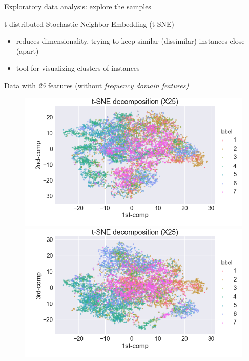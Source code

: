 \documentclass{if-beamer}
\begin{document}
\begin{frame}{Exploratory data analysis: explore the samples}

        \begin{block}{t-distributed Stochastic Neighbor Embedding (t-SNE)}    
        \begin{itemize}
                \item reduces dimensionality, trying to keep similar (dissimilar) instances close  (apart)
                \item tool for visualizing clusters of instances 
        \end{itemize}                 
        
         \begin{exampleblock}{Data with \emph{25} features (without \emph{frequency domain features)}}
            	 \begin{figure}
                    \includegraphics[scale=0.2]{./figs/tSNE12_X25.png}
                    \includegraphics[scale=0.2]{./figs/tSNE13_X25.png}
                    \end{figure} 
               \end{exampleblock}
   	 \end{block}
	
\end{frame}
 
\end{document}

